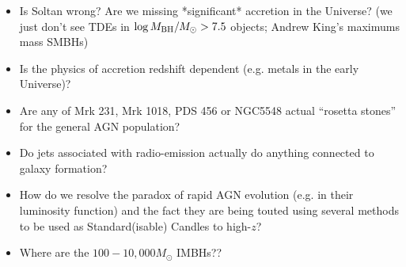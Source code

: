 \documentclass[11pt,a4paper]{article}
\begin{document}
\begin{itemize}
\item Is Soltan wrong?  Are we missing *significant* accretion in the Universe?
        (we just don’t see TDEs in $\log M_{\rm BH}/M_{\odot} > 7.5$ objects; 
 Andrew King’s maximums mass SMBHs) 

\item Is the physics of accretion redshift dependent (e.g. metals in the early Universe)?

\item Are any of Mrk 231, Mrk 1018, PDS 456 or NGC5548 actual “rosetta stones” for the general AGN population?

\item Do jets associated with radio-emission actually do anything connected to galaxy formation?

\item How do we resolve the paradox of rapid AGN evolution (e.g. in their luminosity function) and the fact they are being touted using several methods to be used as Standard(isable) Candles to high-$z$?

\item  Where are the $100 - 10,000 M_{\odot}$ IMBHs??
\end{itemize}
\end{document}
